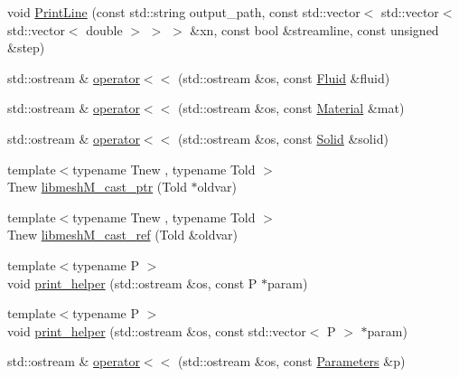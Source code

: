 \begin{DoxyCompactItemize}
\item 
void \mbox{\hyperlink{namespacefemus_aac2a4afaac51207ff5b5ed649f6540c9}{Print\+Line}} (const std\+::string output\+\_\+path, const std\+::vector$<$ std\+::vector$<$ std\+::vector$<$ double $>$ $>$ $>$ \&xn, const bool \&streamline, const unsigned \&step)
\item 
std\+::ostream \& \mbox{\hyperlink{namespacefemus_a37bc14941651d527a0137bd766fb1713}{operator$<$$<$}} (std\+::ostream \&os, const \mbox{\hyperlink{classfemus_1_1_fluid}{Fluid}} \&fluid)
\item 
std\+::ostream \& \mbox{\hyperlink{namespacefemus_ac61df46f1e6dacd6962ad16d94f82c2c}{operator$<$$<$}} (std\+::ostream \&os, const \mbox{\hyperlink{classfemus_1_1_material}{Material}} \&mat)
\item 
std\+::ostream \& \mbox{\hyperlink{namespacefemus_a14aa69576c16496872c6283133972c63}{operator$<$$<$}} (std\+::ostream \&os, const \mbox{\hyperlink{classfemus_1_1_solid}{Solid}} \&solid)
\item 
{\footnotesize template$<$typename Tnew , typename Told $>$ }\\Tnew \mbox{\hyperlink{namespacefemus_a5b274d783d791a1dd5e8ee71d520e8f0}{libmesh\+M\+\_\+cast\+\_\+ptr}} (Told $\ast$oldvar)
\item 
{\footnotesize template$<$typename Tnew , typename Told $>$ }\\Tnew \mbox{\hyperlink{namespacefemus_a2a4532ef8c12e9870ad10eb2c4a14efa}{libmesh\+M\+\_\+cast\+\_\+ref}} (Told \&oldvar)
\item 
{\footnotesize template$<$typename P $>$ }\\void \mbox{\hyperlink{namespacefemus_a9e14cd43ebee4a0f5e3fc2378239152a}{print\+\_\+helper}} (std\+::ostream \&os, const P $\ast$param)
\item 
{\footnotesize template$<$typename P $>$ }\\void \mbox{\hyperlink{namespacefemus_a673516e5f037c8f0dd0918b01a16edb1}{print\+\_\+helper}} (std\+::ostream \&os, const std\+::vector$<$ P $>$ $\ast$param)
\item 
std\+::ostream \& \mbox{\hyperlink{namespacefemus_aa6ef47194a2372ade28bce682a749058}{operator$<$$<$}} (std\+::ostream \&os, const \mbox{\hyperlink{classfemus_1_1_parameters}{Parameters}} \&p)
\end{DoxyCompactItemize}
